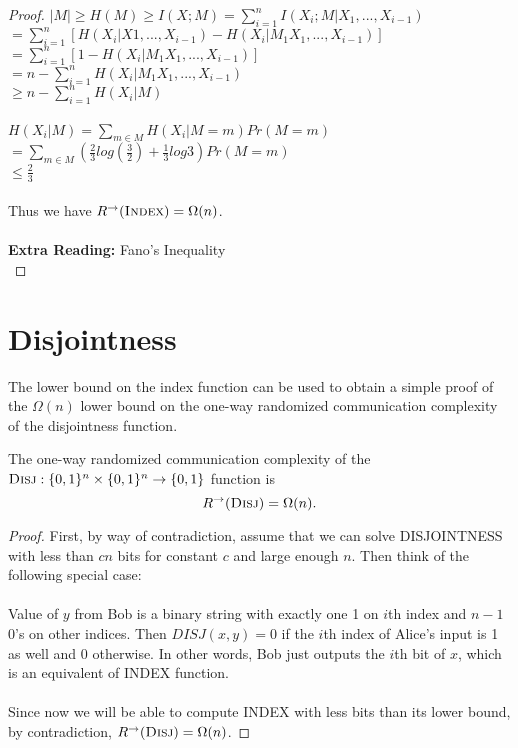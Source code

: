 \begin{proof}
	$|M|\ge H(M) \ge I(X;M) = \sum^n_{i=1} I(X_i;M|X_1,...,X_{i-1})$\\
	$=\sum^n_{i=1} [H(X_i|X1,...,X_{i-1})-H(X_i|M_1X_1,...,X_{i-1})]$
	$=\sum^n_{i=1} [1-H(X_i|M_1X_1,...,X_{i-1})]$\\
	$=n-\sum^n_{i=1} H(X_i|M_1X_1,...,X_{i-1})$\\
	$\ge n-\sum_{i=1}^{n}H(X_i|M)$\\
	\\
	$H(X_i|M)=\sum_{m\in M} H(X_i|M=m)Pr(M=m)$\\
	$= \sum_{m\in M} (\frac23log(\frac32)+\frac13 log3)Pr(M=m)$\\
	$\leq \frac23$\\
	\\
	Thus we have $R^\rightarrow(\textsc{Index}) = \Omega(n)$.\\
	\\
	\textbf{Extra Reading:} Fano's Inequality \\
\end{proof}




\section{Disjointness}

The lower bound on the index function can be used to obtain a simple proof of the $\Omega(n)$ lower bound on the one-way randomized communication complexity of the disjointness function.

\begin{theorem}
	The one-way randomized communication complexity of the $\textsc{Disj} : \{0,1\}^n \times \{0,1\}^n \to \{0,1\}$ function is
	\[
	R^\rightarrow(\textsc{Disj}) = \Omega(n).
	\]
\end{theorem}

\begin{proof}
	First, by way of contradiction, assume that we can solve DISJOINTNESS with less than $cn$ bits for constant $c$ and large enough $n$. Then think of the following special case: \\
	\\
	Value of $y$ from Bob is a binary string with exactly one 1 on $i$th index and $n-1$ 0's on other indices. Then $DISJ(x,y) = 0$ if the $i$th index of Alice's input is 1 as well and 0 otherwise. In other words, Bob just outputs the $i$th bit of $x$, which is an equivalent of INDEX function. \\
	\\
	Since now we will be able to compute INDEX with less bits than its lower bound, by contradiction, $R^\rightarrow(\textsc{Disj}) = \Omega(n)$.
\end{proof}

